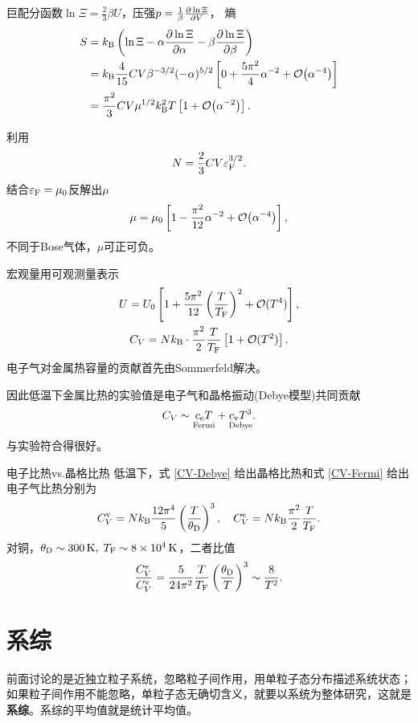 巨配分函数$\ln\Xi=\frac23\beta U$，压强$p=\frac1\beta\frac{\partial^{\;\!\!}\ln\Xi}{\partial V^{\;\!\!}}$，
熵
\begin{align}\notag
	S&=\kB\kh{\ln\Xi-\alpha\pv{\ln\Xi}\alpha-\beta\pv{\ln\Xi}\beta}\\\notag
	&=\kB\frac4{15}CV\beta^{-3/2}(-\alpha)^{5/2}\fkh{0+\frac{5\pi^2}4\alpha^{-2}+\bigo\!\kh{\alpha^{-4}}}\\
	&=\frac{\pi^2}3CV\mu^{1/2}\kB^2T\fkh{1+\bigo\!\kh{\alpha^{-2}}}.
\end{align}

利用
\[
	N=\frac23CV\varepsilon_\mathrm F^{3/2}.
\]
结合$\varepsilon_\mathrm F=\mu_0$反解出$\mu$
\[
	\mu=\mu_0\left[1-\frac{\pi^2}{12}\alpha^{-2}+\mathcal O\!\left(\alpha^{-4}\right)\right],
\]
不同于Bose气体，$\mu$可正可负。

宏观量用可观测量表示
\begin{gather}
	U=U_0\left[1+\frac{5\pi^2}{12}\left(\frac T{T_\mathrm F}\right)^2+\mathcal O(T^4)\right],\\
	C_V=Nk_{\mathrm B}\cdot\frac{\pi^2}{2}\frac T{T_\mathrm F}\left[1+\mathcal O(T^2)\right].\label{CV-Fermi}
\end{gather}
电子气对金属热容量的贡献首先由Sommerfeld解决。

因此低温下金属比热的实验值是电子气和晶格振动(Debye模型)共同贡献
\[
	C_V\sim \underset{\text{Fermi}}{c_\mathrm e T}+\underset{\text{Debye}}{c_\mathrm v T^3}.
\]
与实验符合得很好。
\begin{example}{电子比热vs.晶格比热}{}
	低温下，式 \ref{CV-Debye} 给出晶格比热和式 \ref{CV-Fermi} 给出电子气比热分别为
	\[
	C_V^\mathrm v=Nk_{\mathrm B}\frac{12\pi^4}5\left(\frac T{\theta_\mathrm D}\right)^3,\quad C_V^\mathrm e=Nk_{\mathrm B}\frac{\pi^2}2\frac T{T_\mathrm F}.
	\]
	对铜，$\theta_\Db\sim\SI{300}\K,\;T_\Fm\sim\SI{8e4}\K$，二者比值
	\[
	\frac{C_V^\mathrm e}{C_V^\mathrm v}=\frac5{24\pi^2}\frac T{T_\mathrm F}\left(\frac{\theta_\mathrm D}T\right)^3\sim\frac8{T^2}.
	\]
\end{example}
\clearpage
\section{系综}
前面讨论的是近独立粒子系统，忽略粒子间作用，用单粒子态分布描述系统状态；如果粒子间作用不能忽略，单粒子态无确切含义，就要以系统为整体研究，这就是\textbf{系综}。系综的平均值就是统计平均值。
